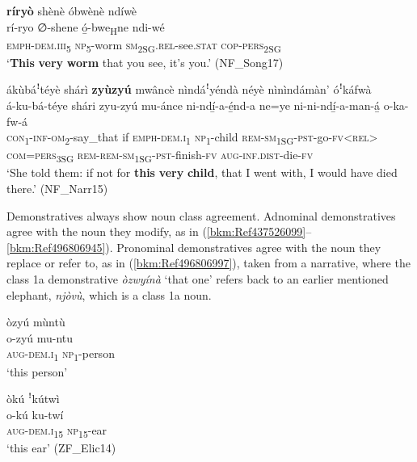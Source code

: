 \ea
\label{bkm:Ref99547938}
\textbf{ríryò} shènè óbwènè ndíwè\\
\gll rí-ryo      ∅-shene  ó̲-bwe\textsubscript{H}ne    ndi-wé\\
\textsc{emph}-\textsc{dem}.\textsc{iii}\textsubscript{5}  \textsc{np}\textsubscript{5}-worm  \textsc{sm}\textsubscript{2SG}.\textsc{rel}-see.\textsc{stat}  \textsc{cop}-\textsc{pers}\textsubscript{2SG}\\
\glt ‘\textbf{This} \textbf{very} \textbf{worm} that you see, it’s you.’ (NF\_Song17)
\z

\ea
\label{bkm:Ref99547939}
ákùbáꜝtéyè shárì \textbf{zyùzyú} mwâncè nìndáꜝyéndà néyè nìnìndámàn’ óꜝkáfwà\\
\gll á-ku-bá-téye      shári  zyu-zyú  mu-ánce ni-ndí̲-a-é̲nd-a      ne=ye
ni-ni-ndí̲-a-man-á̲      o-ka-fw-á\\
\textsc{con}\textsubscript{1}-\textsc{inf}-\textsc{om}\textsubscript{2}-say\_that  if  \textsc{emph}-\textsc{dem}.\textsc{i}\textsubscript{1}  \textsc{np}\textsubscript{1}-child
\textsc{rem}-\textsc{sm}\textsubscript{1SG}-\textsc{pst}-go-\textsc{fv}<\textsc{rel}>  \textsc{com}=\textsc{pers}\textsubscript{3SG}
\textsc{rem}-\textsc{rem}-\textsc{sm}\textsubscript{1SG}-\textsc{pst}-finish-\textsc{fv}  \textsc{aug}-\textsc{inf}.\textsc{dist}-die-\textsc{fv}\\
\glt ‘She told them: if not for \textbf{this} \textbf{very} \textbf{child}, that I went with, I would have died there.’ (NF\_Narr15)
\z

Demonstratives always show noun class agreement. Adnominal demonstratives agree with the noun they modify, as in (\ref{bkm:Ref437526099}--\ref{bkm:Ref496806945}). Pronominal demonstratives agree with the noun they replace or refer to, as in (\ref{bkm:Ref496806997}), taken from a narrative, where the class 1a demonstrative \textit{òzwyínà} ‘that one’ refers back to an earlier mentioned elephant, \textit{njòvù}, which is a class 1a noun.

\ea
\label{bkm:Ref437526099}
òzyú mùntù\\
\gll o-zyú    mu-ntu\\
\textsc{aug}-\textsc{dem}.\textsc{i}\textsubscript{1}  \textsc{np}\textsubscript{1}-person\\
\glt ‘this person’
\z

\ea
\label{bkm:Ref437526104}
\label{bkm:Ref496806945}òkú ꜝkútwì\\
\gll o-kú    ku-twí\\
\textsc{aug}-\textsc{dem}.\textsc{i}\textsubscript{15}  \textsc{np}\textsubscript{15}-ear\\
\glt ‘this ear’ (ZF\_Elic14)
\z

